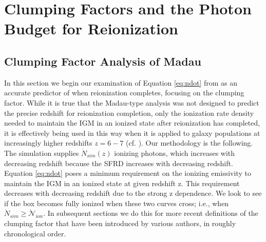 \section{Clumping Factors and the Photon Budget for Reionization}
\label{sec:ClumpingFactors}



\subsection{Clumping Factor Analysis of Madau}
\label{Madau}
In this section we begin our examination of Equation \eqref{eq:ndot} from \cite{MadauEtAl1999} as an accurate predictor of when reionization completes, focusing on the clumping factor. While  it is true that the Madau-type analysis was not designed to predict the precise redshift for reionization completion, only the ionization rate density needed to maintain the IGM in an ionized state after reionization has completed, it is effectively being used in this way when it is applied to galaxy populations at increasingly higher redshifts $z=6-7$  (cf. \cite{FanEtAl2006, RobertsonEtAl2013}).
Our methodology is the following. The simulation supplies $\dot{N}_{sim}(z)$ ionizing photons, which increases with decreasing redshift because the SFRD increases with decreasing redshift.  Equation \eqref{eq:ndot} poses a minimum requirement on the ionizing emissivity to maintain the IGM in an ionized state at given redshift z. This requirement decreases with decreasing redshift due to the strong z dependence.  We look to see if the box becomes fully ionized when these two curves cross; i.e., when $\dot{N}_{sim} \geq \dot{\mathcal{N}}_{ion} $. In subsequent sections we do this for more recent definitions of the clumping factor that have been introduced by various authors, in roughly chronological order. 


